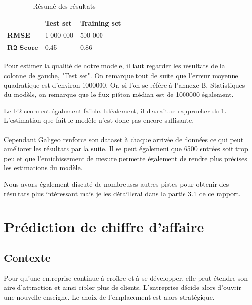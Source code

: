 \begin{table}[H]
    \centering
    \begin{tabular}{l|l|l|}
    \cline{2-3}
                                            & \textbf{Test set} & \textbf{Training set} \\ \hline
    \multicolumn{1}{|l|}{\textbf{RMSE}}     & 1 000 000         & 500 000                \\ \hline
    \multicolumn{1}{|l|}{\textbf{R2 Score}} & 0.45              & 0.86                  \\ \hline
    \end{tabular}
    \caption{Résumé des résultats}
\end{table}

Pour estimer la qualité de notre modèle, il faut regarder les résultats de la colonne de gauche, "Test set". On remarque tout de suite que l’erreur moyenne quadratique est d’environ 1000000. Or, si l’on se réfère à l’annexe B, Statistiques du modèle, on remarque que le flux piéton médian est de 1000000 également.

Le R2 score est également faible. Idéalement, il devrait se rapprocher de 1. L’estimation que fait le modèle n’est donc pas encore suffisante. 

\paragraph*{}

Cependant Galigeo renforce son dataset à chaque arrivée de données ce qui peut améliorer les résultats par la suite. Il se peut également que 6500 entrées soit trop peu et que l’enrichissement de mesure permette également de rendre plus précises les estimations du modèle.

Nous avons également discuté de nombreuses autres pistes pour obtenir des résultats plus intéressant mais je les détaillerai dans la partie 3.1 de ce rapport.

\section{Prédiction de chiffre d'affaire}

\subsection{Contexte}

Pour qu’une entreprise continue à croître et à se développer, elle peut étendre son aire d’attraction et ainsi cibler plus de clients. L’entreprise décide alors d’ouvrir une nouvelle enseigne. Le choix de l’emplacement est alors stratégique.

